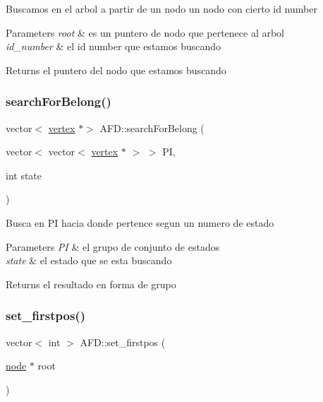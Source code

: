 Buscamos en el arbol a partir de un nodo un nodo con cierto id number 
\begin{DoxyParams}{Parameters}
{\em root} & es un puntero de nodo que pertenece al arbol \\
\hline
{\em id\+\_\+number} & el id number que estamos buscando \\
\hline
\end{DoxyParams}
\begin{DoxyReturn}{Returns}
el puntero del nodo que estamos buscando 
\end{DoxyReturn}
\hypertarget{class_a_f_d_a894aafa23513f5b6dbdcbf3109281b4e}{}\label{class_a_f_d_a894aafa23513f5b6dbdcbf3109281b4e} 
\subsubsection{\texorpdfstring{search\+For\+Belong()}{searchForBelong()}}
{\footnotesize\ttfamily vector$<$ \hyperlink{structvertex}{vertex} $\ast$$>$ A\+F\+D\+::search\+For\+Belong (\begin{DoxyParamCaption}\item[{vector$<$ vector$<$ \hyperlink{structvertex}{vertex} $\ast$ $>$ $>$}]{PI,  }\item[{int}]{state }\end{DoxyParamCaption})}

Busca en PI hacia donde pertence segun un numero de estado 
\begin{DoxyParams}{Parameters}
{\em PI} & el grupo de conjunto de estados \\
\hline
{\em state} & el estado que se esta buscando \\
\hline
\end{DoxyParams}
\begin{DoxyReturn}{Returns}
el resultado en forma de grupo 
\end{DoxyReturn}
\hypertarget{class_a_f_d_a9d332b7d65be308507b10e7abf0a9d11}{}\label{class_a_f_d_a9d332b7d65be308507b10e7abf0a9d11} 
\subsubsection{\texorpdfstring{set\+\_\+firstpos()}{set\_firstpos()}}
{\footnotesize\ttfamily vector$<$ int $>$ A\+F\+D\+::set\+\_\+firstpos (\begin{DoxyParamCaption}\item[{\hyperlink{structnode}{node} $\ast$}]{root }\end{DoxyParamCaption})}

